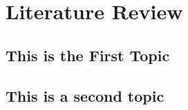\section{Literature Review}
\lipsum[1]
\subsection{This is the First Topic}
\lipsum[6-8]
\subsection{This is a second topic}
\lipsum[10-13]
